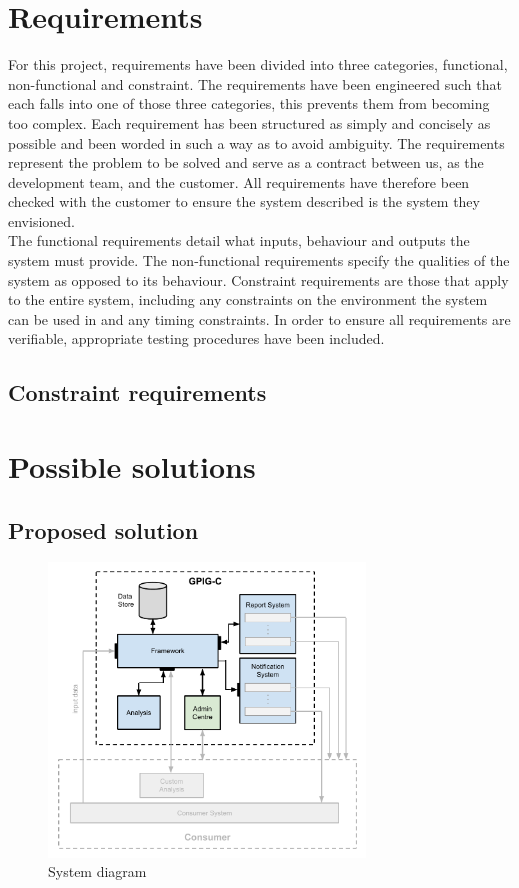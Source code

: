 \documentclass[10pt,a4paper]{article}
\begin{document}
\section{Requirements}
For this project, requirements have been divided into three categories, functional, non-functional and constraint. The requirements have been engineered such that each falls into one of those three categories, this prevents them from becoming too complex. Each requirement has been structured as simply and concisely as possible and been worded in such a way as to avoid ambiguity. The requirements represent the problem to be solved and serve as a contract between us, as the development team, and the customer. All requirements have therefore been checked with the customer to ensure the system described is the system they envisioned.\\
The functional requirements detail what inputs, behaviour and outputs the system must provide. The non-functional requirements specify the qualities of the system as opposed to its behaviour. Constraint requirements are those that apply to the entire system, including any constraints on the environment the system can be used in and any timing constraints. In order to ensure all requirements are verifiable, appropriate testing procedures have been included.







\subsection{Constraint requirements}

\section{Possible solutions}

\subsection{Proposed solution}

\begin{figure}[hptb]
  \centering
\includegraphics[width=0.75\textwidth]{system-architecture.pdf}
  \caption{System diagram}
\end{figure}
\end{document}
